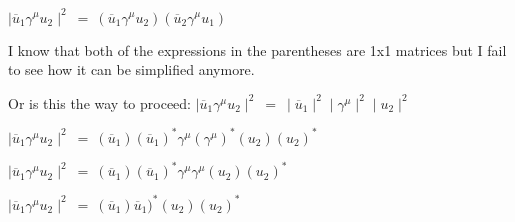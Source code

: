 \documentclass[12pt]{article}
\def \ou{\overline{u}}
\def \ga{\gamma}
\begin{document}
\begin{enumerate}
$\mid \ou_1 \ga^\mu u_2 \mid^2 ~=~ (\ou_1 \ga^\mu u_2)(\ou_2 \ga^\mu u_1)$

I know that both of the expressions in the parentheses are 1x1 matrices but I fail to see how it can be simplified anymore.

Or is this the way to proceed:
$\mid \ou_1 \ga^\mu u_2 \mid^2 ~=~ \mid\ou_1\mid^2 \mid\ga^\mu\mid^2 \mid u_2 \mid^2$

$\mid \ou_1 \ga^\mu u_2 \mid^2 ~=~ (\ou_1)(\overline{u}_1)^*\ga^\mu (\ga^\mu)^* (u_2)(u_2)^*$

$\mid \ou_1 \ga^\mu u_2 \mid^2 ~=~ (\ou_1)(\ou_1)^*\ga^\mu \ga^\mu (u_2)(u_2)^*$

$\mid \ou_1 \ga^\mu u_2 \mid^2 ~=~ (\ou_1)\ou_1)^* (u_2)(u_2)^*$

\end{enumerate}
\end{document}
